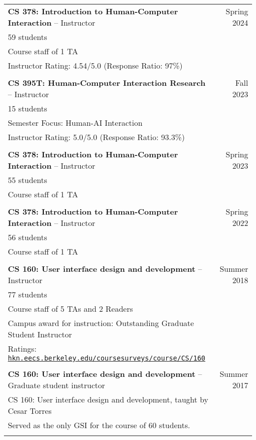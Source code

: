 \begin{longtable}{Xr}
	\textbf{CS 378: Introduction to Human-Computer Interaction} -- Instructor & Spring 2024 \\
	59 students &  \\
	Course staff of 1 TA &  \\
	Instructor Rating: 4.54/5.0 (Response Ratio: 97\%) &  \\
	\\

	\textbf{CS 395T: Human-Computer Interaction Research} -- Instructor & Fall 2023 \\
	15 students &  \\
	Semester Focus: Human-AI Interaction &  \\
	Instructor Rating: 5.0/5.0 (Response Ratio: 93.3\%) &  \\
	\\

	\textbf{CS 378: Introduction to Human-Computer Interaction} -- Instructor & Spring 2023 \\
	55 students &  \\
	Course staff of 1 TA &  \\
	\\

	\textbf{CS 378: Introduction to Human-Computer Interaction} -- Instructor & Spring 2022 \\
	56 students &  \\
	Course staff of 1 TA &  \\
	\\

	\textbf{CS 160: User interface design and development} -- Instructor & Summer 2018 \\
	77 students &  \\
	Course staff of 5 TAs and 2 Readers &  \\
	Campus award for instruction: Outstanding Graduate Student Instructor &  \\
	Ratings: \href{https://hkn.eecs.berkeley.edu/coursesurveys/course/CS/160}{\tt hkn.eecs.berkeley.edu/coursesurveys/course/CS/160} &  \\
	\\

	\textbf{CS 160: User interface design and development} -- Graduate student instructor & Summer 2017 \\
	CS 160: User interface design and development, taught by Cesar Torres &  \\
	Served as the only GSI for the course of 60 students. &  \\
	\\


\end{longtable}
